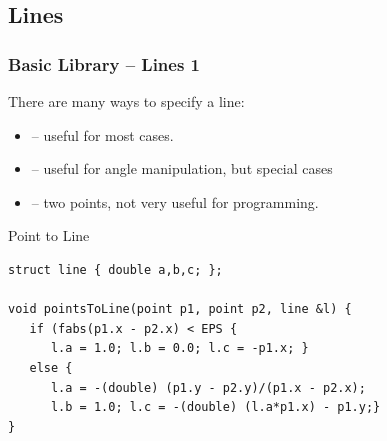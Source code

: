 \subsection{Lines}

\begin{frame}[fragile]
  \frametitle{Basic Library -- Lines 1}

  {\small
  There are many ways to specify a line:

  \begin{itemize}
  \item {} -- useful for most cases.
  \item {} -- useful for angle manipulation, but special cases
  \item {} -- two points, not very useful for programming.
  \end{itemize}

  \begin{exampleblock}{Point to Line}
\begin{verbatim}
struct line { double a,b,c; };

void pointsToLine(point p1, point p2, line &l) {
   if (fabs(p1.x - p2.x) < EPS {
      l.a = 1.0; l.b = 0.0; l.c = -p1.x; }
   else {
      l.a = -(double) (p1.y - p2.y)/(p1.x - p2.x);
      l.b = 1.0; l.c = -(double) (l.a*p1.x) - p1.y;}
}
\end{verbatim}
  \end{exampleblock}
  }
\end{frame}

